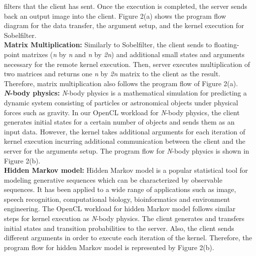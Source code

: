 \documentclass[conference]{IEEEtran}
\begin{document}
filters that the client has sent.
%
Once the execution is completed, the server sends back an output image
into the client.
%
Figure 2(a) shows the program flow diagram for the data transfer, the argument
setup, and the kernel execution for Sobelfilter.\\
%
\textbf{Matrix Multiplication:} Similarly to Sobelfilter, the client
sends to floating-point matrixes (\textit{n} by \textit{n} and
\textit{n} by \textit{2n}) and additional small states and
arguments necessary for the remote kernel execution.
%
Then, server executes multiplication of two matrices and returns one
\textit{n} by \textit{2n} matrix to the client as the result.
%
Therefore, matrix multiplication also follows the program flow of Figure
2(a).\\
%
\textbf{\textit{N}-body physics:} \textit{N}-body physics is a
mathematical simulation for predicting a dynamic system consisting of
particles or astronomical objects under physical forces such as gravity.
%
In our OpenCL workload for \textit{N}-body physics, the client generates
initial states for a certain number of objects and sends them as an
input data.
%
However, the kernel takes additional arguments for each iteration of
kernel execution incurring additional communication between the client
and the server for the arguments setup.
%
The program flow for \textit{N}-body physics is shown in Figure 2(b).\\
%
\textbf{Hidden Markov model:} Hidden Markov model is a popular
statistical tool for modeling generative sequences which can be
characterized by observable sequences.
%
It has been applied to a wide range of applications such as image,
speech recognition, computational biology, bioinformatics and
environment engineering.
%
The OpenCL workload for hidden Markov model follows similar steps for
kernel execution as \textit{N}-body physics.
%
The client generates and transfers initial states and transition
probabilities to the server.
%
Also, the client sends different arguments in order to execute each
iteration of the kernel.
%
Therefore, the program flow for hidden Markov model is represented by Figure 2(b).
%
\end{document}
